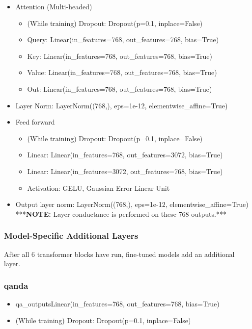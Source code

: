 \documentclass{article}
\begin{document}
\begin{itemize}
\begin{itemize}
\begin{itemize}
				\item Attention (Multi-headed)
				\begin{itemize}
					\item (While training) Dropout: Dropout(p=0.1, inplace=False)
					\item Query: Linear(in\_features=768, out\_features=768, bias=True)
					\item Key: Linear(in\_features=768, out\_features=768, bias=True)
					\item Value: Linear(in\_features=768, out\_features=768, bias=True)
					\item Out: Linear(in\_features=768, out\_features=768, bias=True)
				\end{itemize}
				\item Layer Norm: LayerNorm((768,), eps=1e-12, elementwise\_affine=True)
				\item Feed forward
				\begin{itemize}
					\item (While training) Dropout: Dropout(p=0.1, inplace=False)
					\item Linear: Linear(in\_features=768, out\_features=3072, bias=True)
					\item Linear: Linear(in\_features=3072, out\_features=768, bias=True)
					\item Activation: GELU, Gaussian Error Linear Unit
				\end{itemize}
				\item Output layer norm: LayerNorm((768,), eps=1e-12, elementwise\_affine=True) \\
				***\textbf{NOTE:} Layer conductance is performed on these 768 outputs.***
			\end{itemize}
		\end{itemize}
	\end{itemize}
	
	\subsubsection{Model-Specific Additional Layers}
	
	After all $6$ transformer blocks have run, fine-tuned models add an additional layer.
	
	\subsubsection*{qanda}
	
	\begin{itemize}
		\item qa\_outputsLinear(in\_features=768, out\_features=768, bias=True)
		\item (While training) Dropout: Dropout(p=0.1, inplace=False)
	\end{itemize}
	
\end{document}
